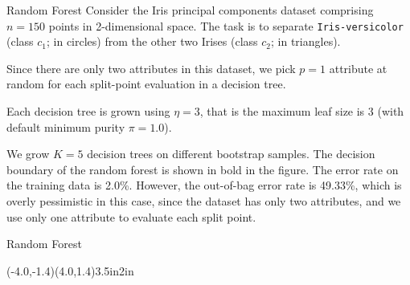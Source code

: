 \begin{frame}{Random Forest}
    Consider the Iris principal
    components dataset comprising $n=150$ points in 2-dimensional space.
    The task is to separate {\tt Iris-versicolor} (class $c_1$; in circles) from the other two
  Irises (class $c_2$; in triangles). 

\medskip
  
  Since there are only two attributes in this dataset, we pick $p=1$
  attribute at random for each split-point evaluation in a decision
  tree. 

\medskip
  

Each decision tree is grown using $\eta=3$, that is the
  maximum leaf size is 3 (with default minimum purity $\pi=1.0$).

\medskip
  

  We grow $K=5$ decision trees on different bootstrap samples. The
  decision boundary of the random forest is shown in bold in the
  figure. The error rate on the training data is 2.0\%. However, the
  out-of-bag error rate is 49.33\%, which is overly pessimistic in this
  case, since the dataset has only two attributes, and we use only one
  attribute to evaluate each split point. 
\end{frame}

\begin{frame}[fragile]{Random Forest}

 \centerline{
     \psgraph[tickstyle=bottom,Ox=-4,Oy=-1.4,Dx=1,Dy=1]{->}(-4.0,-1.4)(4.0,1.4){3.5in}{2in}%
\listplot[plotstyle=dots,dotstyle=Bo,showpoints=true,
          nEnd=50,plotNo=1,plotNoMax=2]{\dataPC}
\listplot[plotstyle=dots,dotstyle=Btriangle,showpoints=true,
          nStart=51,plotNo=1,plotNoMax=2]{\dataPC}
\listplot[plotstyle=dots,dotstyle=Bo,showpoints=true]{\dataB}
\endpsgraph
}
\end{frame}

